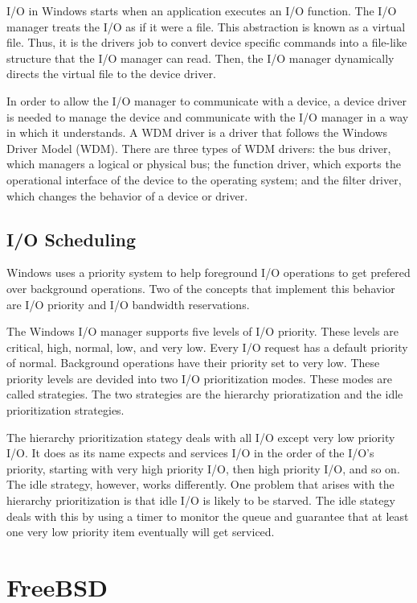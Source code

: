 \documentclass[journal,letterpaper,draftclsnofoot,onecolumn,10pt]{IEEEtran}
\begin{document}
I/O in Windows starts when an application executes an I/O function. The I/O manager treats the I/O as if it were a file. This abstraction is known as a virtual file. Thus, it is the drivers job to convert device specific commands into a file-like structure that the I/O manager can read. Then, the I/O manager dynamically directs the virtual file to the device driver.\cite{2ris12}

In order to allow the I/O manager to communicate with a device, a device driver is needed to manage the device and communicate with the I/O manager in a way in which it understands. A WDM driver is a driver that follows the Windows Driver Model (WDM). There are three types of WDM drivers: the bus driver, which managers a logical or physical bus; the function driver, which exports the operational interface of the device to the operating system; and the filter driver, which changes the behavior of a device or driver.\cite{2ris12}

\subsection{I/O Scheduling}
Windows uses a priority system to help foreground I/O operations to get prefered over background operations. Two of the concepts that implement this behavior are I/O priority and I/O bandwidth reservations.\cite{2ris12}

The Windows I/O manager supports five levels of I/O priority. These levels are critical, high, normal, low, and very low. Every I/O request has a default priority of normal. Background operations have their priority set to very low. These priority levels are devided into two I/O prioritization modes. These modes are called strategies. The two strategies are the hierarchy prioratization and the idle prioritization strategies.

The hierarchy prioritization stategy deals with all I/O except very low priority I/O. It does as its name expects and services I/O in the order of the I/O's priority, starting with very high priority I/O, then high priority I/O, and so on. The idle strategy, however, works differently. One problem that arises with the hierarchy prioritization is that idle I/O is likely to be starved. The idle stategy deals with this by using a timer to monitor the queue and guarantee that at least one very low priority item eventually will get serviced.\cite{2ris12}

\section{FreeBSD}
\end{document}
